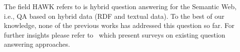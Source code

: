 The field HAWK refers to is hybrid question answering for the Semantic Web, i.e., QA based on hybrid data (RDF and textual data).
To the best of our knowledge, none of the previous works has addressed this question so far.
For further insights please refer to~\cite{Kolomiyets:2011,DBLP:journals/semweb/LopezUSM11} which present surveys on existing question answering approaches.
